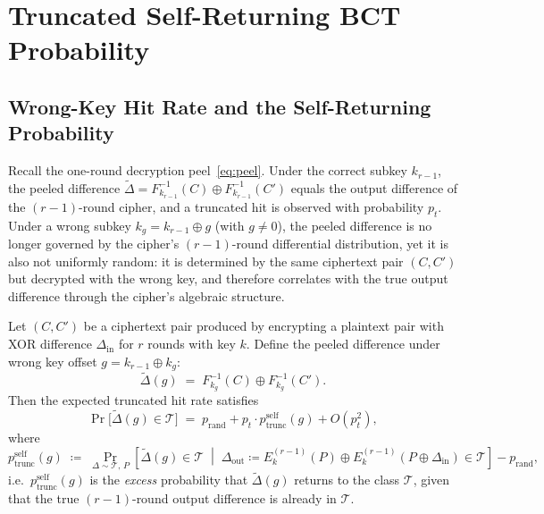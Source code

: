 \documentclass[runningheads]{llncs}
\newcommand{\pself}{p^{\mathrm{self}}_{\mathrm{trunc}}}
\newcommand{\xor}{\oplus}
\begin{document}
\section{Truncated Self-Returning BCT Probability}
\label{sec:bct}

\subsection{Wrong-Key Hit Rate and the Self-Returning Probability}
\label{subsec:pself-def}

Recall the one-round decryption peel~\eqref{eq:peel}.  Under the correct
subkey $k_{r-1}$, the peeled difference $\widetilde\Delta = F_{k_{r-1}}^{-1}(C)
\xor F_{k_{r-1}}^{-1}(C')$ equals the output difference of the
$(r{-}1)$-round cipher, and a truncated hit is observed with probability
$p_t$.  Under a wrong subkey $k_g = k_{r-1} \xor g$ (with $g \ne 0$), the
peeled difference is no longer governed by the cipher's $(r{-}1)$-round
differential distribution, yet it is also not uniformly random: it is
determined by the same ciphertext pair $( C, C')$ but decrypted with the
wrong key, and therefore correlates with the true output difference through
the cipher's algebraic structure.

\begin{proposition}
  \label{prop:wkp}
  Let $(C, C')$ be a ciphertext pair produced by encrypting a plaintext
  pair with XOR difference $\Delta_{\mathrm{in}}$ for $r$ rounds with key $k$.
  Define the peeled difference under wrong key offset $g = k_{r-1} \xor k_g$:
  \[
    \widetilde\Delta(g) \;=\; F_{k_g}^{-1}(C) \xor F_{k_g}^{-1}(C').
  \]
  Then the expected truncated hit rate satisfies
  \begin{equation}
    \label{eq:wkp-decomp}
    \Pr\!\bigl[\widetilde\Delta(g) \in \mathcal{T}\bigr]
    \;=\;
    p_{\mathrm{rand}} + p_t \cdot \pself(g) + O(p_t^2),
  \end{equation}
  where
  \begin{equation}
    \label{eq:pself-def}
    \pself(g) \;\coloneqq\;
    \Pr_{\Delta \sim \mathcal{T},\, P}\!\left[
      \widetilde\Delta(g) \in \mathcal{T}
      \;\middle|\;
      \Delta_{\mathrm{out}} \coloneqq E_k^{(r-1)}(P) \xor E_k^{(r-1)}(P \xor \Delta_{\mathrm{in}})
      \in \mathcal{T}
    \right] - p_{\mathrm{rand}},
  \end{equation}
  i.e.\ $\pself(g)$ is the \emph{excess} probability that $\widetilde\Delta(g)$
  returns to the class $\mathcal{T}$, given that the true $(r{-}1)$-round
  output difference is already in $\mathcal{T}$.
\end{proposition}
\end{document}
